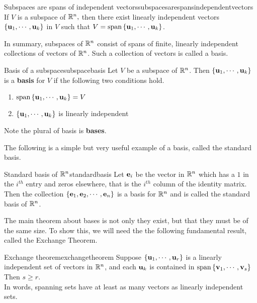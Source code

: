 \begin{corollary}{Subspaces are spans of independent vectors}{subspacesarespansindependentvectors}
If $V$ is a subspace of $\mathbb{R}^{n},$ then there exist linearly independent 
vectors $\left\{ {\bf u}_{1},\cdots ,{\bf u}_{k}\right\}$ in $V$ such
that $V=\mbox{span}\left\{ {\bf u}_{1},\cdots ,{\bf u}_{k}\right\} $.
\end{corollary}

In summary, subspaces of $\mathbb{R}^{n}$ consist of spans of finite,
linearly independent collections of vectors of $\mathbb{R}^{n}$.  Such
a collection of vectors is called a basis.

\begin{definition}{Basis of a subspace}{subspacebasis}
Let $V$ be a subspace of $\mathbb{R}^{n}$. Then $\left\{
{\bf u}_{1},\cdots ,{\bf u}_{k}\right\} $ is a \textbf{basis} for $V$ if the following two conditions hold.

\begin{enumerate}
\item $\mbox{span}\left\{ {\bf u}_{1},\cdots ,{\bf u}_{k}\right\} =V$
\item $\left\{ {\bf u}_{1},\cdots ,{\bf u}_{k}\right\} $ is linearly
independent
\end{enumerate}

Note the plural of basis is \textbf{bases}. 
\end{definition}

The following is a simple but very useful example of a basis, called the standard basis.

\begin{definition}{Standard basis of $\mathbb{R}^n$}{standardbasis}
Let ${\bf e}_i$ be the vector in $\mathbb{R}^n$ which has a $1$ in the $i^{th}$ entry and zeros elsewhere, that is the $i^{th}$ column of the identity matrix. Then the collection $\left\{{\bf e}_1, {\bf e}_2, \cdots, {\bf e}_n
\right\}$ is a basis for
$\mathbb{R}^n$ and is called the standard basis of $\mathbb{R}^n$.
\end{definition}

The main theorem about bases is not only they exist, but that they
must be of the same size. To show this, we will need the the following
fundamental result, called the Exchange Theorem.

\begin{theorem}{Exchange theorem}{exchangetheorem}
Suppose $\left\{ {\bf u}_{1},\cdots ,{\bf u}_{r}\right\} $ is a
linearly independent set of vectors in $\mathbb{R}^n$, and each
${\bf u}_{k}$ is contained in $\mbox{span}\left\{ {\bf v}_{1},\cdots
,{\bf v}_{s}\right\}$ Then $s\geq r.$ \\
In words, spanning sets have at least as many vectors as linearly
independent sets.
\end{theorem}

